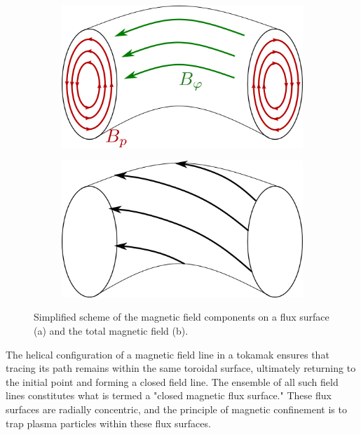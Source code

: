 \begin{figure}[H]
	\centering
	\begin{subfigure}[b]{0.4\textwidth}
		\centering
		\includegraphics[width=1.\textwidth]{schemes/BpolBtor.png}
		\label{fig:TokamakBasics_BpolBtor}
	\end{subfigure}
	\begin{subfigure}[b]{0.4\textwidth}
		\centering
		\includegraphics[width=1.\textwidth]{schemes/Btot.png}
		\label{fig:TokamakBasics_Btot}
	\end{subfigure}
	\caption{Simplified scheme of the magnetic field components on a flux surface (a) and the total magnetic field (b).}
	\label{fig:1_magneticConfigurationTorus}
\end{figure}

The helical configuration of a magnetic field line in a tokamak ensures that tracing its path remains within the same toroidal surface, ultimately returning to the initial point and forming a closed field line. The ensemble of all such field lines constitutes what is termed a "closed magnetic flux surface." These flux surfaces are radially concentric, and the principle of magnetic confinement is to trap plasma particles within these flux surfaces.  \\


